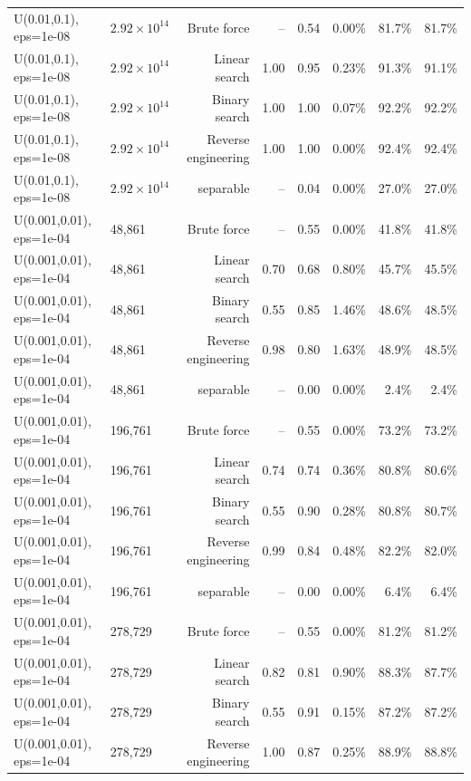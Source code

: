 \begin{tabular}{llrrrrrr}
U(0.01,0.1), eps=1e-08 & $2.92\times 10^{14}$ & Brute force & -- & 0.54 & 0.00\% & 81.7\% & 81.7\% \\
U(0.01,0.1), eps=1e-08 & $2.92\times 10^{14}$ & Linear search & 1.00 & 0.95 & 0.23\% & 91.3\% & 91.1\% \\
U(0.01,0.1), eps=1e-08 & $2.92\times 10^{14}$ & Binary search & 1.00 & 1.00 & 0.07\% & 92.2\% & 92.2\% \\
U(0.01,0.1), eps=1e-08 & $2.92\times 10^{14}$ & Reverse engineering & 1.00 & 1.00 & 0.00\% & 92.4\% & 92.4\% \\
U(0.01,0.1), eps=1e-08 & $2.92\times 10^{14}$ & separable & -- & 0.04 & 0.00\% & 27.0\% & 27.0\% \\
U(0.001,0.01), eps=1e-04 & 48,861 & Brute force & -- & 0.55 & 0.00\% & 41.8\% & 41.8\% \\
U(0.001,0.01), eps=1e-04 & 48,861 & Linear search & 0.70 & 0.68 & 0.80\% & 45.7\% & 45.5\% \\
U(0.001,0.01), eps=1e-04 & 48,861 & Binary search & 0.55 & 0.85 & 1.46\% & 48.6\% & 48.5\% \\
U(0.001,0.01), eps=1e-04 & 48,861 & Reverse engineering & 0.98 & 0.80 & 1.63\% & 48.9\% & 48.5\% \\
U(0.001,0.01), eps=1e-04 & 48,861 & separable & -- & 0.00 & 0.00\% & 2.4\% & 2.4\% \\
U(0.001,0.01), eps=1e-04 & 196,761 & Brute force & -- & 0.55 & 0.00\% & 73.2\% & 73.2\% \\
U(0.001,0.01), eps=1e-04 & 196,761 & Linear search & 0.74 & 0.74 & 0.36\% & 80.8\% & 80.6\% \\
U(0.001,0.01), eps=1e-04 & 196,761 & Binary search & 0.55 & 0.90 & 0.28\% & 80.8\% & 80.7\% \\
U(0.001,0.01), eps=1e-04 & 196,761 & Reverse engineering & 0.99 & 0.84 & 0.48\% & 82.2\% & 82.0\% \\
U(0.001,0.01), eps=1e-04 & 196,761 & separable & -- & 0.00 & 0.00\% & 6.4\% & 6.4\% \\
U(0.001,0.01), eps=1e-04 & 278,729 & Brute force & -- & 0.55 & 0.00\% & 81.2\% & 81.2\% \\
U(0.001,0.01), eps=1e-04 & 278,729 & Linear search & 0.82 & 0.81 & 0.90\% & 88.3\% & 87.7\% \\
U(0.001,0.01), eps=1e-04 & 278,729 & Binary search & 0.55 & 0.91 & 0.15\% & 87.2\% & 87.2\% \\
U(0.001,0.01), eps=1e-04 & 278,729 & Reverse engineering & 1.00 & 0.87 & 0.25\% & 88.9\% & 88.8\% \\

\end{tabular}
